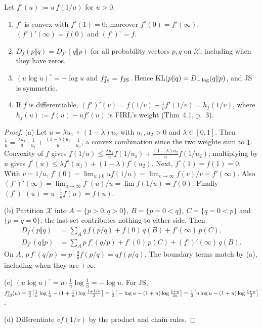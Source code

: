 \begin{proposition}\label{prop:div-perspective}
Let $f^\circ(u):=u\,f(1/u)$ for $u>0$.
\begin{enumerate}[nosep,label=(\alph*)]
\item $f^\circ$ is convex with $f^\circ(1)=0$; moreover $f^\circ(0)=f'(\infty)$, $(f^\circ)'(\infty)=f(0)$ and $(f^\circ)^\circ=f$.
\item $D_f(p\Vert q)=D_{f^\circ}(q\Vert p)$ for all probability vectors $p,q$ on $\mathcal X$, including when they have zeros.
\item $(u\log u)^\circ=-\log u$ and $f_{\mathrm{JS}}^\circ=f_{\mathrm{JS}}$. Hence $\mathrm{KL}(p\Vert q)=D_{-\log}(q\Vert p)$, and JS is symmetric.
\item If $f$ is differentiable, $(f^\circ)'(v)=f(1/v)-\frac1vf'(1/v)=h_f(1/v)$, where $h_f(u):=f(u)-uf'(u)$ is FIRL's weight (Thm~4.1, p.~3).
\end{enumerate}
\end{proposition}
\begin{proof}
(a) Let $u=\lambda u_1+(1-\lambda)u_2$ with $u_1,u_2>0$ and $\lambda\in[0,1]$.
Then $\frac1u=\frac{\lambda u_1}{u}\cdot\frac1{u_1}+\frac{(1-\lambda)u_2}{u}\cdot\frac1{u_2}$, a convex combination since the two weights sum to $1$.
Convexity of $f$ gives $f(1/u)\le\frac{\lambda u_1}uf(1/u_1)+\frac{(1-\lambda)u_2}uf(1/u_2)$; multiplying by $u$ gives $f^\circ(u)\le\lambda f^\circ(u_1)+(1-\lambda)f^\circ(u_2)$.
Next, $f^\circ(1)=f(1)=0$.
With $v=1/u$, $f^\circ(0)=\lim_{u\downarrow0}uf(1/u)=\lim_{v\to\infty}f(v)/v=f'(\infty)$.
Also $(f^\circ)'(\infty)=\lim_{u\to\infty}f^\circ(u)/u=\lim f(1/u)=f(0)$.
Finally $(f^\circ)^\circ(u)=u\cdot\frac1uf(u)=f(u)$.

(b) Partition $\mathcal X$ into $A=\{p>0,q>0\}$, $B=\{p=0<q\}$, $C=\{q=0<p\}$ and $\{p=q=0\}$; the last set contributes nothing to either side. Then
\begin{align*}
D_f(p\Vert q)&=\textstyle\sum_Aq\,f(p/q)+f(0)\,q(B)+f'(\infty)\,p(C),\\
D_{f^\circ}(q\Vert p)&=\textstyle\sum_Ap\,f^\circ(q/p)+f^\circ(0)\,p(C)+(f^\circ)'(\infty)\,q(B).
\end{align*}
On $A$, $p\,f^\circ(q/p)=p\cdot\frac qp f(p/q)=q f(p/q)$.
The boundary terms match by (a), including when they are $+\infty$.

(c) $(u\log u)^\circ=u\cdot\frac1u\log\frac1u=-\log u$. For JS,
$f_{\mathrm{JS}}^\circ(u)=\frac u2\big[\frac1u\log\frac1u-(1+\frac1u)\log\frac{1+1/u}2\big]
=\frac12\big[-\log u-(1+u)\log\frac{1+u}{2u}\big]
=\frac12\big[u\log u-(1+u)\log\frac{1+u}2\big]$.

(d) Differentiate $vf(1/v)$ by the product and chain rules.
\end{proof}

